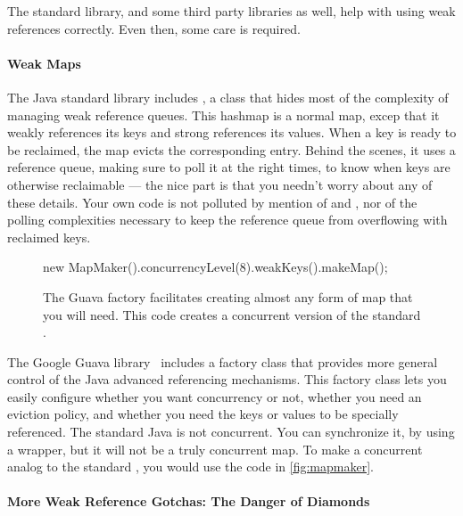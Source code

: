 The standard library, and some third party libraries as well, help with using
weak references correctly. Even then, some care is required.

\paragraph{Weak Maps}
\label{sec:weakhashmap}

The Java standard library includes , a class that hides most
of the complexity of managing weak reference queues. This hashmap is a normal
map, excep that it weakly references its keys and strong references its values.
When a key is ready to be reclaimed, the map evicts the corresponding entry.
Behind the scenes, it uses a reference queue, making sure to poll it at the
right times, to know when keys are otherwise reclaimable --- the nice part is
that you needn't worry about any of these details. Your own code is not polluted
by mention of  and , nor of the
polling complexities necessary to keep the reference queue from overflowing with
reclaimed keys.

\begin{figure}
\centering
\begin{framedlisting}
new MapMaker().concurrencyLevel(8).weakKeys().makeMap();
\end{framedlisting}
\caption{The Guava  factory facilitates creating almost any
form of map that you will need. This code creates a concurrent version of the
standard .}
\label{fig:mapmaker}
\end{figure}
The Google Guava library~\cite{google-guava} includes a  factory
class that provides more general control of the Java advanced referencing
mechanisms. This factory class lets you easily configure whether you want
concurrency or not, whether you need an eviction policy, and whether you need
the keys or values to be specially referenced. The standard Java
 is not concurrent. You can synchronize it, by using a
 wrapper, but it will not be a truly
concurrent map. To make a concurrent analog to the standard ,
you would use the code in \autoref{fig:mapmaker}.

\paragraph{More Weak Reference Gotchas: The Danger of Diamonds}
\label{sec:strongweakdiamonds}


